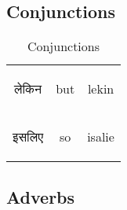 \newpage
\subsection{Conjunctions}
\begin{table}[H]
    \centering
    \begin{tabular}{c|c|c}
\begin{hindi} लेकिन \end{hindi} & but & lekin \\  
 \begin{hindi} इसलिए \end{hindi} & so & isalie \\  
    \end{tabular}
    \caption{Conjunctions}
    \label{tab:conjunctions}
\end{table}

\newpage
\subsection{Adverbs}

